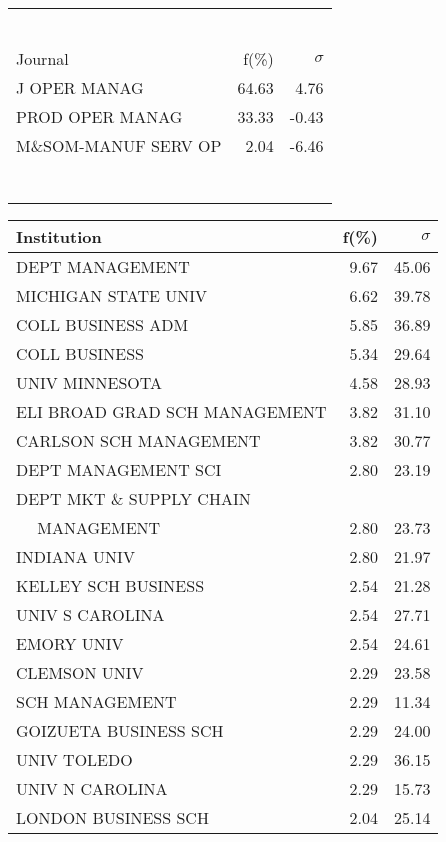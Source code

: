 \documentclass[a4paper,11pt]{report}
\begin{document}
\begin{landscape}
\begin{table}[!ht]
{\begin{tabular}{|l r r|}
 &  & \\
 &  & \\
 &  & \\
 &  & \\
 &  & \\
 &  & \\
\hline
\hline
Journal & f(\%) & $\sigma$\\
\hline
J OPER MANAG & 64.63 & 4.76\\
PROD OPER MANAG & 33.33 & -0.43\\
M\&SOM-MANUF SERV OP & 2.04 & -6.46\\
 &  & \\
 &  & \\
 &  & \\
 &  & \\
 &  & \\
 &  & \\
 &  & \\
\hline
\end{tabular}
}
{\scriptsize\begin{tabular}{|l r r|}
\hline
Institution & f(\%) & $\sigma$\\
\hline
DEPT MANAGEMENT & 9.67 & 45.06\\
MICHIGAN STATE UNIV & 6.62 & 39.78\\
COLL BUSINESS ADM & 5.85 & 36.89\\
COLL BUSINESS & 5.34 & 29.64\\
UNIV MINNESOTA & 4.58 & 28.93\\
ELI BROAD GRAD SCH MANAGEMENT & 3.82 & 31.10\\
CARLSON SCH MANAGEMENT & 3.82 & 30.77\\
DEPT MANAGEMENT SCI & 2.80 & 23.19\\
DEPT MKT \& SUPPLY CHAIN &  & \\
$\quad$ MANAGEMENT & 2.80 & 23.73\\
INDIANA UNIV & 2.80 & 21.97\\
KELLEY SCH BUSINESS & 2.54 & 21.28\\
UNIV S CAROLINA & 2.54 & 27.71\\
EMORY UNIV & 2.54 & 24.61\\
CLEMSON UNIV & 2.29 & 23.58\\
SCH MANAGEMENT & 2.29 & 11.34\\
GOIZUETA BUSINESS SCH & 2.29 & 24.00\\
UNIV TOLEDO & 2.29 & 36.15\\
UNIV N CAROLINA & 2.29 & 15.73\\
LONDON BUSINESS SCH & 2.04 & 25.14\\

\end{tabular}}
\end{table}
\end{landscape}
\end{document}

